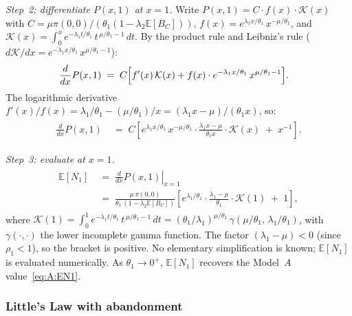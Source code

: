 \medskip\noindent\textit{Step~2: differentiate $P(x,1)$ at $x=1$.}\enspace
Write $P(x,1)=C\cdot f(x)\cdot\mathcal{K}(x)$ with
$C=\mu\pi(0,0)/(\theta_1(1-\lambda_2\mathbb{E}[B_C]))$,
$f(x)=e^{\lambda_1 x/\theta_1}\,x^{-\mu/\theta_1}$, and
$\mathcal{K}(x)=\int_0^x e^{-\lambda_1 t/\theta_1}\,t^{\,\mu/\theta_1-1}\,dt$.
By the product rule and Leibniz's rule
($d\mathcal{K}/dx = e^{-\lambda_1 x/\theta_1}\,x^{\mu/\theta_1-1}$):
\begin{align}
    \begin{split}
        \frac{d}{dx}P(x,1)
        &\;=\; C\Bigl[f'(x)\,\mathcal{K}(x)+f(x)\cdot e^{-\lambda_1 x/\theta_1}\,x^{\mu/\theta_1-1}\Bigr].
    \end{split}
\end{align}
The logarithmic derivative $f'(x)/f(x)=\lambda_1/\theta_1-(\mu/\theta_1)/x=(\lambda_1 x-\mu)/(\theta_1 x)$,
so:
\begin{align}
    \begin{split}
        \frac{d}{dx}P(x,1)
        &\;=\; C\left[
            e^{\lambda_1 x/\theta_1}\,x^{-\mu/\theta_1}\cdot
            \frac{\lambda_1 x-\mu}{\theta_1 x}\cdot\mathcal{K}(x)
            \;+\; x^{-1}
        \right].
    \end{split}
\end{align}

\medskip\noindent\textit{Step~3: evaluate at $x=1$.}\enspace
\begin{align}
    \begin{split}
        \mathbb{E}[N_1]
        &\;=\; \left.\frac{d}{dx}P(x,1)\right|_{x=1} \\
        &\;=\; \frac{\mu\,\pi(0,0)}{\theta_1\,(1-\lambda_2\mathbb{E}[B_C])}
        \left[
            e^{\lambda_1/\theta_1}\cdot\frac{\lambda_1-\mu}{\theta_1}
            \cdot\mathcal{K}(1)
            \;+\; 1
        \right],
    \end{split}
    \label{eq:C2:EN1}
\end{align}
where $\mathcal{K}(1)=\int_0^1 e^{-\lambda_1 t/\theta_1}\,t^{\,\mu/\theta_1-1}\,dt
=(\theta_1/\lambda_1)^{\mu/\theta_1}\,\gamma(\mu/\theta_1,\,\lambda_1/\theta_1)$,
with $\gamma(\cdot,\cdot)$ the lower incomplete gamma function.
The factor $(\lambda_1-\mu)<0$ (since $\rho_1<1$), so the bracket is positive.
No elementary simplification is known; $\mathbb{E}[N_1]$ is evaluated numerically.
As $\theta_1\to0^+$, $\mathbb{E}[N_1]$ recovers the Model~$A$ value~\eqref{eq:A:EN1}.

\subsubsection*{Little's Law with abandonment}

